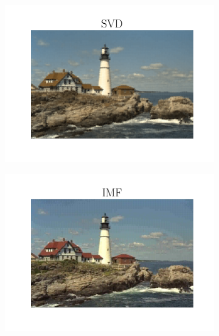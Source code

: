 \begin{figure}[t]
\begin{subfigure}{.23\textwidth}
	\end{subfigure}
    \begin{subfigure}{.23\textwidth}
		\centering
		\includegraphics[trim=1.7cm 1cm 1.7cm 1cm, clip, width=1\textwidth]{figures/kodim21_SVD_bpp_0.315.pdf}
	\end{subfigure}
    \begin{subfigure}{.23\textwidth}
		\centering
		\includegraphics[trim=1.7cm 1cm 1.7cm 1cm, clip, width=1\textwidth]{figures/kodim21_IMF_bpp_0.305.pdf}
	\end{subfigure}


\end{figure}
